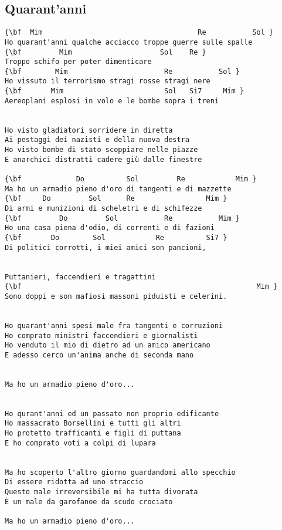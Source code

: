\documentclass[a4paper]{article}
\begin{document}
\subsection{Quarant'anni}
\begin{Verbatim}[commandchars=\\\{\}]
{\bf  Mim                                     Re           Sol }
Ho quarant'anni qualche acciacco troppe guerre sulle spalle 
{\bf         Mim                     Sol    Re }
Troppo schifo per poter dimenticare 
{\bf        Mim                       Re           Sol }
Ho vissuto il terrorismo stragi rosse stragi nere 
{\bf       Mim                        Sol   Si7     Mim }
Aereoplani esplosi in volo e le bombe sopra i treni 


Ho visto gladiatori sorridere in diretta 
Ai pestaggi dei nazisti e della nuova destra 
Ho visto bombe di stato scoppiare nelle piazze 
E anarchici distratti cadere giù dalle finestre 

{\bf             Do          Sol         Re            Mim }
Ma ho un armadio pieno d'oro di tangenti e di mazzette 
{\bf     Do         Sol      Re                 Mim }
Di armi e munizioni di scheletri e di schifezze 
{\bf         Do         Sol           Re           Mim }
Ho una casa piena d'odio, di correnti e di fazioni 
{\bf       Do        Sol            Re          Si7 }
Di politici corrotti, i miei amici son pancioni, 


Puttanieri, faccendieri e tragattini 
{\bf                                                        Mim }
Sono doppi e son mafiosi massoni piduisti e celerini. 


Ho quarant'anni spesi male fra tangenti e corruzioni 
Ho comprato ministri faccendieri e giornalisti 
Ho venduto il mio di dietro ad un amico americano 
E adesso cerco un'anima anche di seconda mano 


Ma ho un armadio pieno d'oro...


Ho qurant'anni ed un passato non proprio edificante 
Ho massacrato Borsellini e tutti gli altri 
Ho protetto trafficanti e figli di puttana 
E ho comprato voti a colpi di lupara 


Ma ho scoperto l'altro giorno guardandomi allo specchio 
Di essere ridotta ad uno straccio 
Questo male irreversibile mi ha tutta divorata 
È un male da garofanoe da scudo crociato 

Ma ho un armadio pieno d'oro...

\end{Verbatim}
\newpage
\end{document}
